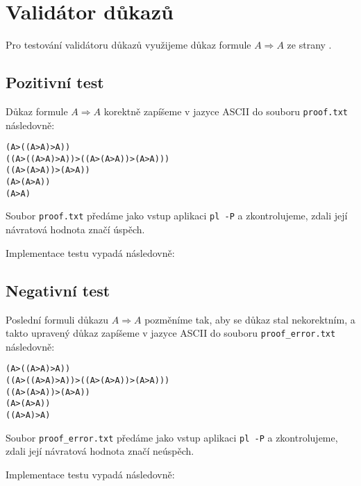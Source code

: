 \documentclass[thesis=B,czech,hidelinks]{FITthesis}[2012/06/26]
\begin{document}
\section{Validátor důkazů}

Pro testování validátoru důkazů využijeme důkaz formule $A \Rightarrow A$ ze strany \pageref{ex:proof}.

\subsection{Pozitivní test}

Důkaz formule $A \Rightarrow A$ korektně zapíšeme v jazyce ASCII do souboru \texttt{proof.txt} následovně:

\begin{verbatim}
(A>((A>A)>A))
((A>((A>A)>A))>((A>(A>A))>(A>A)))
((A>(A>A))>(A>A))
(A>(A>A))
(A>A)
\end{verbatim}

Soubor \texttt{proof.txt} předáme jako vstup aplikaci \texttt{pl -P} a zkontrolujeme, zdali její návratová hodnota značí úspěch.

Implementace testu vypadá následovně:

\begin{figure}
\centering

\end{figure}

\subsection{Negativní test}

Poslední formuli důkazu $A \Rightarrow A$ pozměníme tak, aby se důkaz stal nekorektním, a takto upravený důkaz zapíšeme v jazyce ASCII do souboru \texttt{proof\_error.txt} následovně:

\begin{verbatim}
(A>((A>A)>A))
((A>((A>A)>A))>((A>(A>A))>(A>A)))
((A>(A>A))>(A>A))
(A>(A>A))
((A>A)>A)
\end{verbatim}

Soubor \texttt{proof\_error.txt} předáme jako vstup aplikaci \texttt{pl -P} a zkontrolujeme, zdali její návratová hodnota značí neúspěch.

Implementace testu vypadá následovně:

\begin{figure}
\centering

\end{figure}
\end{document}
